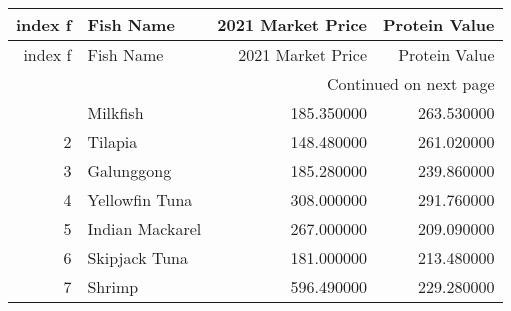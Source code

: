 \begin{longtable}{rlrr}
\toprule
index f & Fish Name & 2021 Market Price & Protein Value \\
\midrule
\endfirsthead
\toprule
index f & Fish Name & 2021 Market Price & Protein Value \\
\midrule
\endhead
\midrule
\multicolumn{4}{r}{Continued on next page} \\
\midrule
\endfoot
\bottomrule
\endlastfoot
1 & Milkfish & 185.350000 & 263.530000 \\
2 & Tilapia & 148.480000 & 261.020000 \\
3 & Galunggong & 185.280000 & 239.860000 \\
4 & Yellowfin Tuna & 308.000000 & 291.760000 \\
5 & Indian Mackarel & 267.000000 & 209.090000 \\
6 & Skipjack Tuna & 181.000000 & 213.480000 \\
7 & Shrimp & 596.490000 & 229.280000 \\
\end{longtable}
